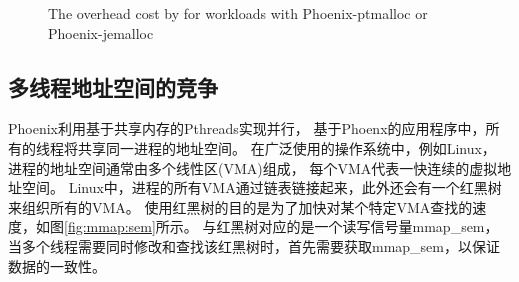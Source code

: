 \begin{figure}[!h!t]  
	\centering
	\caption{
		The overhead cost by \lock for
		workloads with Phoenix-ptmalloc or Phoenix-jemalloc}
	\label{fig:phoenix:spinlock}
\end{figure}



\subsection{多线程地址空间的竞争}
Phoenix利用基于共享内存的Pthreads实现并行，
基于Phoenx的应用程序中，所有的线程将共享同一进程的地址空间。
在广泛使用的操作系统中，例如Linux，
进程的地址空间通常由多个线性区(VMA)组成，
每个VMA代表一快连续的虚拟地址空间。
Linux中，进程的所有VMA通过链表链接起来，此外还会有一个红黑树来组织所有的VMA。
使用红黑树的目的是为了加快对某个特定VMA查找的速度，如图\ref{fig:mmap:sem}所示。
与红黑树对应的是一个读写信号量mmap\_sem，
当多个线程需要同时修改和查找该红黑树时，首先需要获取mmap\_sem，以保证数据的一致性。

